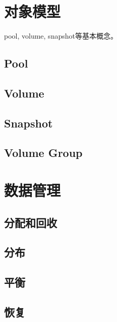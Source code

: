 \chapter{对象模型}

pool, volume, snapshot等基本概念。

\section{Pool}
\section{Volume}
\section{Snapshot}
\section{Volume Group}

\chapter{数据管理}

\section{分配和回收}
\section{分布}
\section{平衡}
\section{恢复}

